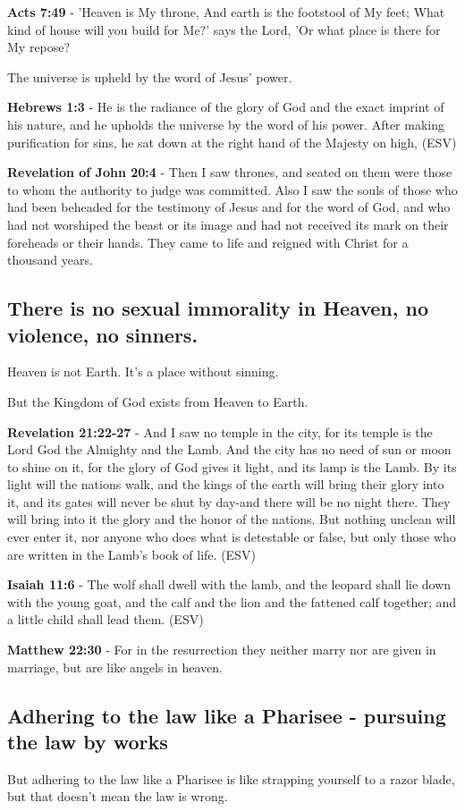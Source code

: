 \documentclass[11pt]{article}
\begin{document}
\textbf{Acts 7:49} - 'Heaven is My throne, And earth is the footstool of My feet; What kind of house will you build for Me?' says the Lord, 'Or what place is there for My repose?

The universe is upheld by the word of Jesus' power.

\textbf{Hebrews 1:3} - He is the radiance of the glory of God and the exact imprint of his nature, and he upholds the universe by the word of his power. After making purification for sins, he sat down at the right hand of the Majesty on high, (ESV)

\textbf{Revelation of John 20:4} - Then I saw thrones, and seated on them were those to whom the authority to judge was committed. Also I saw the souls of those who had been beheaded for the testimony of Jesus and for the word of God, and who had not worshiped the beast or its image and had not received its mark on their foreheads or their hands. They came to life and reigned with Christ for a thousand years.

\subsection{There is no sexual immorality in Heaven, no violence, no sinners.}
\label{sec:org7d2d641}
Heaven is not Earth. It's a place without sinning.

But the Kingdom of God exists from Heaven to Earth.

\textbf{Revelation 21:22-27} - And I saw no temple in the city, for its temple is the Lord God the Almighty and the Lamb. And the city has no need of sun or moon to shine on it, for the glory of God gives it light, and its lamp is the Lamb. By its light will the nations walk, and the kings of the earth will bring their glory into it, and its gates will never be shut by day-and there will be no night there. They will bring into it the glory and the honor of the nations. But nothing unclean will ever enter it, nor anyone who does what is detestable or false, but only those who are written in the Lamb's book of life. (ESV)

\textbf{Isaiah 11:6} - The wolf shall dwell with the lamb, and the leopard shall lie down with the young goat, and the calf and the lion and the fattened calf together; and a little child shall lead them. (ESV)

\textbf{Matthew 22:30} - For in the resurrection they neither marry nor are given in marriage, but are like angels in heaven.

\subsection{Adhering to the law like a Pharisee - pursuing the law by works}
\label{sec:org06d229b}
But adhering to the law like a Pharisee is like strapping yourself to a razor blade, but that doesn't mean the law is wrong.
\end{document}
